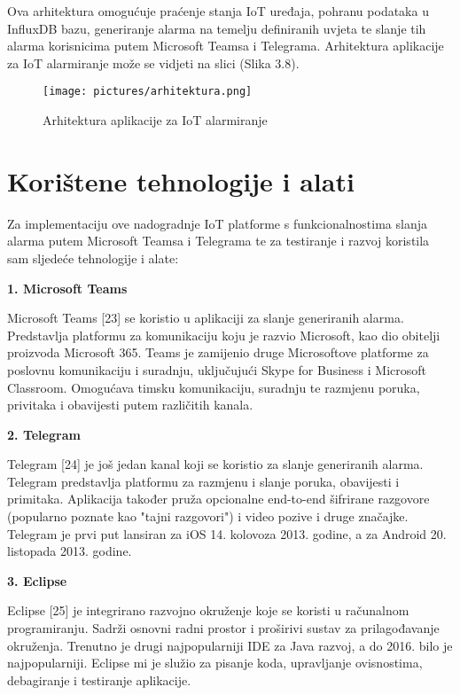 \documentclass[times, utf8, zavrsni]{fer}
\begin{document}
\vspace{\baselineskip}
 Ova arhitektura omogućuje praćenje stanja IoT uređaja, pohranu podataka u InfluxDB bazu, generiranje alarma na temelju definiranih uvjeta te slanje tih alarma korisnicima putem Microsoft Teamsa i Telegrama. Arhitektura aplikacije za IoT alarmiranje može se vidjeti na slici (Slika 3.8).

 \begin{figure}[h]
			\texttt{[image: pictures/arhitektura.png]} %
		\centering
			\caption{Arhitektura aplikacije za IoT alarmiranje}
			\label{fig:promjene}
\end{figure}
\newpage
\section{ Korištene tehnologije i alati}
Za implementaciju ove nadogradnje IoT platforme s funkcionalnostima slanja alarma putem Microsoft Teamsa i Telegrama te za testiranje i razvoj koristila sam sljedeće tehnologije i alate:


\textbf{1. Microsoft Teams}

Microsoft Teams [23] se koristio u aplikaciji za slanje generiranih alarma. Predstavlja platformu za komunikaciju koju je razvio Microsoft, kao dio obitelji proizvoda Microsoft 365. Teams je zamijenio druge Microsoftove platforme za poslovnu komunikaciju i suradnju, uključujući Skype for Business i Microsoft Classroom. Omogućava timsku komunikaciju, suradnju te razmjenu poruka, privitaka i obavijesti putem različitih kanala. 

\textbf{2. Telegram}

Telegram [24] je još jedan kanal koji se koristio za slanje generiranih alarma. Telegram predstavlja platformu za razmjenu i slanje poruka, obavijesti i primitaka. Aplikacija također pruža opcionalne end-to-end šifrirane razgovore (popularno poznate kao "tajni razgovori") i video pozive i druge značajke. Telegram je prvi put lansiran za iOS 14. kolovoza 2013. godine, a za Android 20. listopada 2013. godine.

\textbf{3. Eclipse}

Eclipse [25] je integrirano razvojno okruženje koje se koristi u računalnom programiranju. Sadrži osnovni radni prostor i proširivi sustav za prilagođavanje okruženja. Trenutno je drugi najpopularniji IDE za Java razvoj, a do 2016. bilo je najpopularniji. Eclipse mi je služio za pisanje koda, upravljanje ovisnostima, debagiranje i testiranje aplikacije.
\end{document}
